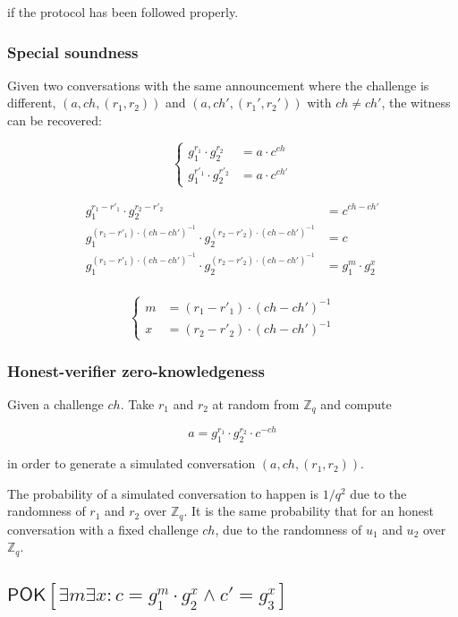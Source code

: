 \documentclass{article}
\begin{document}
if the protocol has been followed properly.

\subsubsection{Special soundness}

Given two conversations with the same announcement where the
challenge is different,
$(a, ch, (r_1, r_2))$ and $(a, ch', (r_1', r_2'))$ with $ch \neq ch'$,
the witness can be recovered:

$$
\begin{cases}
  g_1^{r_1} \cdot g_2^{r_2} &= a \cdot c^{ch} \\
  g_1^{r'_1} \cdot g_2^{r'_2} &= a \cdot c^{ch'}
\end{cases}
$$

\begin{align*}
  g_1^{r_1 - r'_1} \cdot g_2^{r_2 - r'_2} &= c^{ch - ch'} \\
  g_1^{(r_1 - r'_1) \cdot (ch - ch')^{-1}} \cdot g_2^{(r_2 - r'_2) \cdot (ch - ch')^{-1}} &= c \\
  g_1^{(r_1 - r'_1) \cdot (ch - ch')^{-1}} \cdot g_2^{(r_2 - r'_2) \cdot (ch - ch')^{-1}} &= g_1^m \cdot g_2^x \\
\end{align*}

$$
\begin{cases}
  m &= (r_1 - r'_1) \cdot (ch - ch')^{-1} \\
  x &= (r_2 - r'_2) \cdot (ch - ch')^{-1}
\end{cases}
$$

\subsubsection{Honest-verifier zero-knowledgeness}

Given a challenge $ch$. Take $r_1$ and $r_2$ at random from $\mathbb{Z}_q$ 
and compute

$$a = g_1^{r_1} \cdot g_2^{r_2} \cdot c^{-ch}$$

in order to generate a simulated conversation $(a, ch, (r_1, r_2))$.

The probability of a simulated conversation to happen 
is $1/q^2$ due to the randomness of $r_1$ and $r_2$ over $\mathbb{Z}_q$. 
It is the same probability that for an honest conversation with 
a fixed challenge $ch$, due to the randomness of $u_1$ and $u_2$ 
over $\mathbb{Z}_q$.

\subsection{$\mathsf{POK}[\exists m \exists x : c = g_1^m \cdot g_2^x \land c' = g_3^x]$}
\end{document}
